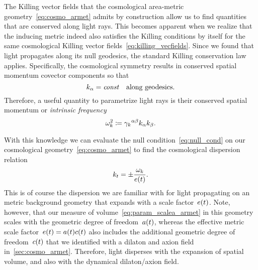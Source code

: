 
The Killing vector fields that the cosmological area-metric geometry~\eqref{eq:cosmo_armet} admits by construction allow us to find quantities that are conserved along light rays. This becomes apparent when we realize that the inducing \FLRW{} metric indeed also satisfies the Killing conditions by itself for the same cosmological Killing vector fields~\eqref{eq:killing_vecfields}. Since we found that light propagates along its null geodesics, the standard Killing conservation law applies. Specifically, the cosmological symmetry results in conserved spatial momentum covector components so that
\begin{equation}
	k_\alpha=\textnormal{\textit{const}} \quad \text{along geodesics.}
\end{equation}
Therefore, a useful quantity to parametrize light rays is their conserved spatial momentum or \emph{intrinsic frequency}
\begin{equation}
	\omega_k^2\coloneqq{\gamma_{k}}^{\alpha\beta}k_\alpha k_\beta
	\mathpunct{.}
\end{equation}

With this knowledge we can evaluate the null condition~\eqref{eq:null_cond} on our cosmological geometry~\eqref{eq:cosmo_armet} to find the cosmological dispersion relation
\begin{equation}\label{eq:disp_cosmo}
	k_t=\pm\frac{\omega_k}{e(t)}
	\mathpunct{.}
\end{equation}
This is of course the dispersion we are familiar with for light propagating on an \FLRW{} metric background geometry that expands with a scale factor~$e(t)$. Note, however, that our measure of volume~\eqref{eq:param_scalea_armet} in this geometry scales with the geometric degree of freedom~$a(t)$, whereas the effective metric scale factor~$e(t)=a(t)c(t)$ also includes the additional geometric degree of freedom~$c(t)$ that we identified with a dilaton and axion field in~\autoref{sec:cosmo_armet}. Therefore, light disperses with the expansion of spatial volume, and also with the dynamical dilaton/axion field.


